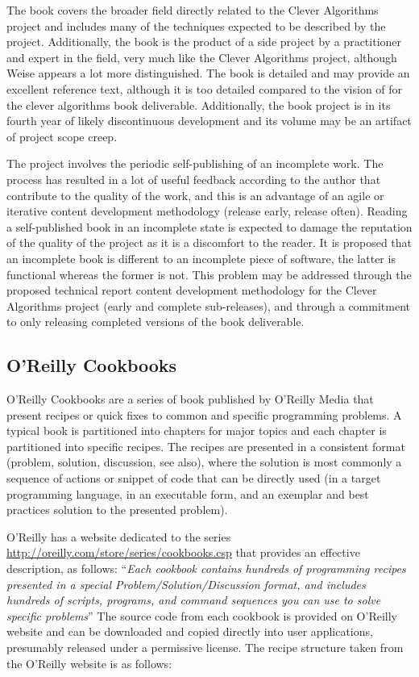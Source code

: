 \documentclass[a4paper, 11pt]{article}
\begin{document}
The book covers the broader field directly related to the Clever Algorithms project and includes many of the techniques expected to be described by the project. Additionally, the book is the product of a side project by a practitioner and expert in the field, very much like the Clever Algorithms project, although Weise appears a lot more distinguished. 
The book is detailed and may provide an excellent reference text, although it is too detailed compared to the vision of for the clever algorithms book deliverable. Additionally, the book project is in its fourth year of likely discontinuous development and its volume may be an artifact of project scope creep. 

The project involves the periodic self-publishing of an incomplete work. The process has resulted in a lot of useful feedback according to the author that contribute to the quality of the work, and this is an advantage of an agile or iterative content development methodology (release early, release often). Reading a self-published book in an incomplete state is expected to damage the reputation of the quality of the project as it is a discomfort to the reader. It is proposed that an incomplete book is different to an incomplete piece of software, the latter is functional whereas the former is not. This problem may be addressed through the proposed technical report content development methodology for the Clever Algorithms project (early and complete sub-releases), and through a commitment to only releasing completed versions of the book deliverable.  

% 
% 
\subsection{O'Reilly Cookbooks}
O'Reilly Cookbooks are a series of book published by O'Reilly Media that present recipes or quick fixes to common and specific programming problems. A typical book is partitioned into chapters for major topics and each chapter is partitioned into specific recipes. The recipes are presented in a consistent format (problem, solution, discussion, see also), where the solution is most commonly a sequence of actions or snippet of code that can be directly used (in a target programming language, in an executable form, and an exemplar and best practices solution to the presented problem). 

O'Reilly has a website dedicated to the series \url{http://oreilly.com/store/series/cookbooks.csp} that provides an effective description, as follows: ``\emph{Each cookbook contains hundreds of programming recipes presented in a special Problem/Solution/Discussion format, and includes hundreds of scripts, programs, and command sequences you can use to solve specific problems}'' The source code from each cookbook is provided on O'Reilly website and can be downloaded and copied directly into user applications, presumably released under a permissive license. The recipe structure taken from the O'Reilly website is as follows:
\end{document}
